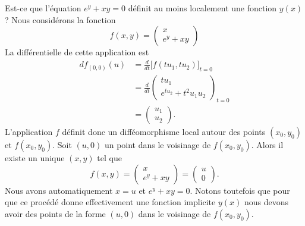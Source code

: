 \begin{example}
    Est-ce que l'équation \( e^{y}+xy=0\) définit au moins localement une fonction \( y(x)\) ? Nous considérons la fonction
    \begin{equation}
        f(x,y)=\begin{pmatrix}
            x    \\ 
            e^{y}+xy    
        \end{pmatrix}
    \end{equation}
    La différentielle de cette application est
    \begin{subequations}
        \begin{align}
            df_{(0,0)}(u)&=\frac{ d }{ dt }\Big[ f(tu_1,tu_2) \Big]_{t=0}\\
            &=\frac{ d }{ dt }\begin{pmatrix}
                tu_1    \\ 
                e^{tu_2}+t^2u_1u_2    
            \end{pmatrix}_{t=0}\\
            &=\begin{pmatrix}
                u_1    \\ 
                u_2    
            \end{pmatrix}.
        \end{align}
    \end{subequations}
    L'application \( f\) définit donc un difféomorphisme local autour des points \( (x_0,y_0)\) et \( f(x_0,y_0)\). Soit \( (u,0)\) un point dans le voisinage de \( f(x_0,y_0)\). Alors il existe un unique \( (x,y)\) tel que
    \begin{equation}
        f(x,y)=\begin{pmatrix}
               x \\ 
            e^y+xy    
        \end{pmatrix}=
        \begin{pmatrix}
            u    \\ 
                0
        \end{pmatrix}.
    \end{equation}
    Nous avons automatiquement \( x=u\) et \( e^y+xy=0\). Notons toutefois que pour que ce procédé donne effectivement une fonction implicite \( y(x)\) nous devons avoir des points de la forme \( (u,0)\) dans le voisinage de \( f(x_0,y_0)\).
\end{example}

